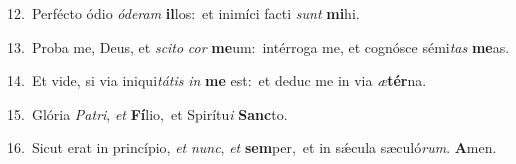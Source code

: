 {\numbfont\textcolor{\numbcolor}{12.}}~Perfécto ódio \textit{ó}\-\textit{de}\textit{ram} \textbf{il}\-los:~\star et inimíci facti \textit{sunt} \textbf{mi}\-hi.\par
{\numbfont\textcolor{\numbcolor}{13.}}~Proba me, Deus, et \textit{sci}\-\textit{to} \textit{cor} \textbf{me}\-um:~\star intérroga me, et cognósce sémi\textit{tas} \textbf{me}\-as.\par
{\numbfont\textcolor{\numbcolor}{14.}}~Et vide, si via iniqui\-\textit{tá}\-\textit{tis} \textit{in} \textbf{me} est:~\star et deduc me in via \textit{æ}\-\textbf{tér}na.\par
{\numbfont\textcolor{\numbcolor}{15.}}~Glória \textit{Pa}\-\textit{tri}, \textit{et} \textbf{Fí}\-lio,~\star et Spirítu\textit{i} \textbf{Sanc}\-to.\par
{\numbfont\textcolor{\numbcolor}{16.}}~Sicut erat in princípio, \textit{et} \textit{nunc}\-, \textit{et} \textbf{sem}\-per,~\star et in sǽcula sæculó\-\textit{rum}\-. \textbf{A}\-men.\par
